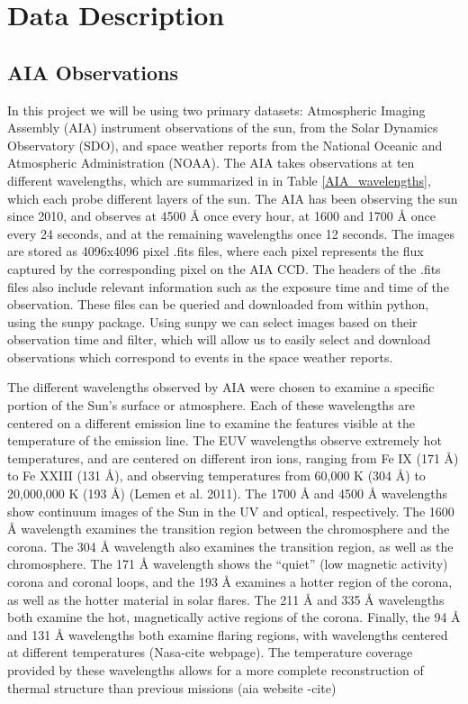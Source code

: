 \documentclass[12pt, letterpaper]{article}
\begin{document}
\section*{Data Description}

\subsection*{AIA Observations}

In this project we will be using two primary datasets: Atmospheric Imaging Assembly (AIA) instrument observations of the sun, from the Solar Dynamics Observatory (SDO), and space weather reports from the National Oceanic and Atmospheric Administration (NOAA).
The AIA takes observations at ten different wavelengths, which are summarized in in Table \ref{AIA_wavelengths}, which each probe different layers of the sun. The AIA has been observing the sun since 2010, and observes at 4500 Å once every hour, at 1600 and 1700 Å once every 24 seconds, and at the remaining wavelengths once 12 seconds. The images are stored as 4096x4096 pixel .fits files, where each pixel represents the flux captured by the corresponding pixel on the AIA CCD. The headers of the .fits files also include relevant information such as the exposure time and time of the observation. These files can be queried and downloaded from within python, using the sunpy package. Using sunpy we can select images based on their observation time and filter, which will allow us to easily select and download observations which correspond to events in the space weather reports. 

The different wavelengths observed by AIA were chosen to examine a specific portion of the Sun’s surface or atmosphere. Each of these wavelengths are centered on a different emission line to examine the features visible at the temperature of the emission line. The EUV wavelengths observe extremely hot temperatures, and are centered on different iron ions, ranging from Fe IX (171 Å) to Fe XXIII (131 Å), and observing temperatures from 60,000 K (304 Å) to 20,000,000 K (193 Å) (Lemen et al. 2011). The 1700 Å and 4500 Å wavelengths show continuum images of the Sun in the UV and optical, respectively. The 1600 Å wavelength examines the transition region between the chromosphere and the corona. The 304 Å wavelength also examines the transition region, as well as the chromosphere. The 171 Å wavelength shows the “quiet” (low magnetic activity) corona and coronal loops, and the 193 Å examines a hotter region of the corona, as well as the hotter material in solar flares. The 211 Å and 335 Å wavelengths both examine the hot, magnetically active regions of the corona. Finally, the 94 Å and 131 Å wavelengths both examine flaring regions, with wavelengths centered at different temperatures (Nasa-cite webpage). The temperature coverage provided by these wavelengths allows for a more complete reconstruction of thermal structure than previous missions (aia website -cite)
\end{document}
